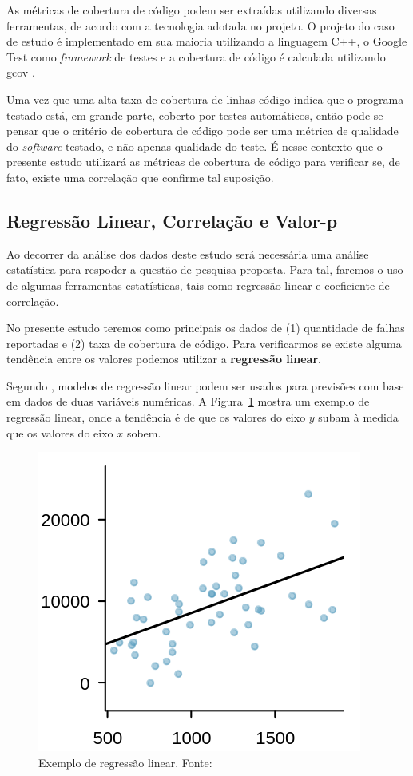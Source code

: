 \documentclass[11.5pt]{article}
\begin{document}
As métricas de cobertura de código podem ser extraídas utilizando diversas ferramentas, de acordo
com a tecnologia adotada no projeto.
O projeto do caso de estudo é implementado em sua maioria utilizando a linguagem C++, o
Google Test \cite{googleTest} como \textit{framework} de testes e
a cobertura de código é calculada utilizando gcov \cite{gcov}.

Uma vez que uma alta taxa de cobertura de linhas código indica que o programa testado está, em
grande parte, coberto por testes automáticos, então pode-se pensar que o critério de cobertura de
código pode ser uma métrica de qualidade do \textit{software} testado, e não apenas qualidade do
teste.
É nesse contexto que o presente estudo utilizará as métricas de cobertura de código para verificar
se, de fato, existe uma correlação que confirme tal suposição.


\subsection{Regressão Linear, Correlação e Valor-p}

Ao decorrer da análise dos dados deste estudo será necessária uma análise estatística para respoder
a questão de pesquisa proposta.
Para tal, faremos o uso de algumas ferramentas estatísticas, tais como regressão linear e
coeficiente de correlação.

No presente estudo teremos como principais os dados de (1) quantidade de falhas reportadas e (2)
taxa de cobertura de código.
Para verificarmos se existe alguma tendência entre os valores podemos utilizar a
\textbf{regressão linear}.

Segundo \cite{openIntroStat}, modelos de regressão linear podem ser usados para previsões com base
em dados de duas variáveis numéricas. A Figura~\ref{fig:lin_reg_basic_example} mostra um exemplo de
regressão linear, onde a tendência é de que os valores do eixo $y$ subam à medida que os
valores do eixo $x$ sobem.

\begin{figure}[ht]
    \centering
    \includegraphics[width=.3\textwidth]{lin_reg_example.png}
    \caption{Exemplo de regressão linear. Fonte: \cite{openIntroStat}}
    \label{fig:lin_reg_basic_example}
\end{figure}
\end{document}
